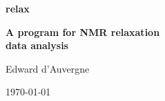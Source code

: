 \documentclass[a4paper, 11pt, twoside, openright]{book}
\newenvironment{spacedpara}{\setlength{\parindent}{0pt} \setlength{\parskip}{2ex plus 0.5ex minus 0.2ex}}{}
\begin{document}

\begin{titlepage}
\begin{center}


{\Huge \textbf{relax}}

{\huge \textbf{A program for NMR relaxation\\data analysis}}

{\Large Edward d'Auvergne}

{\large \today}

\end{center}
\end{titlepage}



\tableofcontents





\begin{spacedpara}




















\end{spacedpara}
\end{document}
